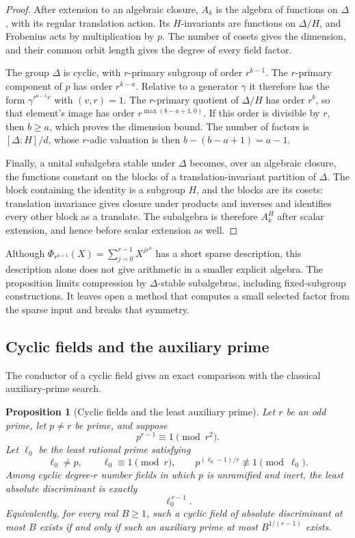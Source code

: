\documentclass[11pt]{article}
\newtheorem{proposition}[theorem]{Proposition}
\theoremstyle{definition}
\theoremstyle{remark}
\begin{document}
\begin{proof}
After extension to an algebraic closure, $A_k$ is the algebra of
functions on $\Delta$, with its regular translation action.  Its
$H$-invariants are functions on $\Delta/H$, and Frobenius acts by
multiplication by $p$.  The number of cosets gives the dimension,
and their common orbit length gives the degree of every field factor.

The group $\Delta$ is cyclic, with $r$-primary subgroup of order
$r^{k-1}$.  The $r$-primary component of $p$ has order $r^{k-a}$.
Relative to a generator $\gamma$ it therefore has the form
$\gamma^{r^{a-1}v}$ with $(v,r)=1$.
The $r$-primary quotient of $\Delta/H$ has order $r^b$, so that
element's image has order $r^{\max(b-a+1,0)}$.
If this order is divisible by $r$, then $b\ge a$, which proves the
dimension bound.  The number of factors is $[\Delta:H]/d$, whose
$r$-adic valuation is then $b-(b-a+1)=a-1$.

Finally, a unital subalgebra stable under $\Delta$ becomes, over an
algebraic closure, the functions constant on the blocks of a
translation-invariant partition of $\Delta$.
The block containing the identity is a subgroup $H$, and the blocks
are its cosets: translation invariance gives closure under products
and inverses and identifies every other block as a translate.
The subalgebra is therefore $A_k^H$ after scalar extension, and hence
before scalar extension as well.
\end{proof}

Although $\Phi_{r^{a+1}}(X)=\sum_{j=0}^{r-1}X^{j r^a}$ has a short
sparse description, this description alone does not give arithmetic
in a smaller explicit algebra.  The proposition limits compression
by $\Delta$-stable subalgebras, including fixed-subgroup constructions.
It leaves open a method that computes a small selected factor from
the sparse input and breaks that symmetry.


\subsection{Cyclic fields and the auxiliary prime}
The conductor of a cyclic field gives an exact comparison with the classical auxiliary-prime search.


\begin{proposition}[Cyclic fields and the least auxiliary prime]
\label{prop:cyclic-discriminant-gate}
Let $r$ be an odd prime, let $p\ne r$ be prime, and suppose
\[
 p^{r-1}\equiv1\pmod{r^2}.
\]
Let $\ell_0$ be the least rational prime satisfying
\[
 \ell_0\ne p,\qquad \ell_0\equiv1\pmod r,
 \qquad p^{(\ell_0-1)/r}\not\equiv1\pmod{\ell_0}.
\]
Among cyclic degree-$r$ number fields in which $p$ is unramified
and inert, the least absolute discriminant is exactly
\[
 \ell_0^{\,r-1}.
\]
Equivalently, for every real $B\ge1$, such a cyclic field of
absolute discriminant at most $B$ exists if and only if such an
auxiliary prime at most $B^{1/(r-1)}$ exists.
\end{proposition}
\end{document}
